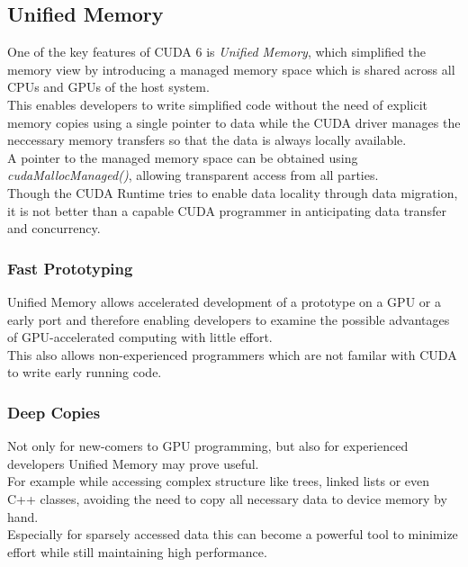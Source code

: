 \subsection{Unified Memory}
\label{unifiedmemory}
One of the key features of CUDA 6 is \emph{Unified Memory}, which simplified the memory view by introducing a managed memory space which is shared
across all CPUs and GPUs of the host system.\\
This enables developers to write simplified code without the need of explicit memory copies using a single pointer to data
while the CUDA driver manages the neccessary memory transfers so that the data is always locally available.\\
A pointer to the managed memory space can be obtained using \emph{cudaMallocManaged()}, allowing transparent access from all parties.\\
Though the CUDA Runtime tries to enable data locality through data migration,
it is not better than a capable CUDA programmer in anticipating data transfer and concurrency.\\
\subsubsection{Fast Prototyping}
Unified Memory allows accelerated development of a prototype on a GPU or a early port
and therefore enabling developers to examine the possible advantages of GPU-accelerated computing with little effort.\\
This also allows non-experienced programmers which are not familar with CUDA to write early running code.\\
\subsubsection{Deep Copies}
Not only for new-comers to GPU programming, but also for experienced developers Unified Memory may prove useful.\\
For example while accessing complex structure like trees, linked lists or even C++ classes,
avoiding the need to copy all necessary data to device memory by hand.\\
Especially for sparsely accessed data this can become a powerful tool to minimize effort while still maintaining high performance.
